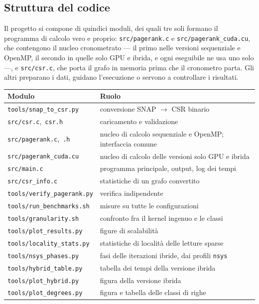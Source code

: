 \documentclass[11pt,a4paper]{article}
\begin{document}
\subsection{Struttura del codice}
Il progetto si compone di quindici moduli, dei quali tre soli formano il
programma di calcolo vero e proprio: \texttt{src/pagerank.c}
e \texttt{src/pagerank\_cuda.cu}, che contengono il
nucleo cronometrato --- il primo nelle versioni sequenziale e OpenMP, il
secondo in quelle solo GPU e ibrida, e ogni eseguibile ne usa uno solo ---,
e \texttt{src/csr.c}, che porta il grafo in memoria prima
che il cronometro parta. Gli altri preparano i dati, guidano l'esecuzione o
servono a controllare i risultati.
\begin{center}
\begin{tabular}{@{}ll@{}}
\toprule
\textbf{Modulo} & \textbf{Ruolo} \\
\midrule
\texttt{tools/snap\_to\_csr.py}       & conversione SNAP $\to$ CSR binario \\
\texttt{src/csr.c},\ \texttt{csr.h}   & caricamento e validazione \\
\texttt{src/pagerank.c},\ \texttt{.h} & nucleo di calcolo sequenziale e OpenMP; interfaccia comune \\
\texttt{src/pagerank\_cuda.cu}        & nucleo di calcolo delle versioni solo GPU e ibrida \\
\texttt{src/main.c}                   & programma principale, output, log dei tempi \\
\texttt{src/csr\_info.c}              & statistiche di un grafo convertito \\
\texttt{tools/verify\_pagerank.py}    & verifica indipendente \\
\texttt{tools/run\_benchmarks.sh}     & misure su tutte le configurazioni \\
\texttt{tools/granularity.sh} & confronto fra il kernel ingenuo e le classi \\
\texttt{tools/plot\_results.py}       & figure di scalabilità \\
\texttt{tools/locality\_stats.py}     & statistiche di località delle letture sparse \\
\texttt{tools/nsys\_phases.py}        & fasi delle iterazioni ibride, dai profili \texttt{nsys} \\
\texttt{tools/hybrid\_table.py}       & tabella dei tempi della versione ibrida \\
\texttt{tools/plot\_hybrid.py}        & figura della versione ibrida \\
\texttt{tools/plot\_degrees.py}       & figura e tabella delle classi di righe \\
\bottomrule
\end{tabular}
\end{center}
\end{document}
